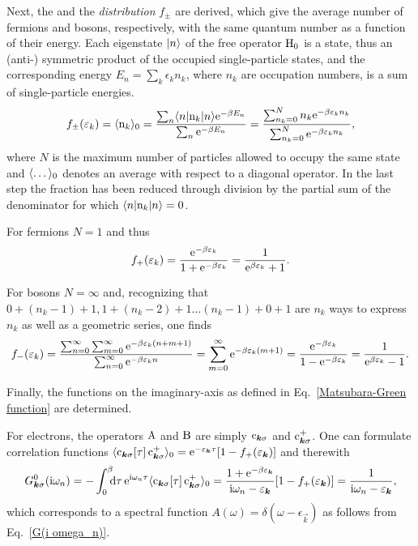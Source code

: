 Next, the \emph{} and the \emph{
distribution} $f_\pm$ are derived, which give the average number of fermions and
bosons, respectively, with the same quantum number as a function of their
energy. Each eigenstate $|n\rangle$ of the free  operator $\mathrm H_0$
is a  state, thus an (anti-) symmetric product of the occupied
single-particle states, and the corresponding energy $E_n = \sum_k \epsilon_k
n_k$, where $n_k$ are occupation numbers, is a sum of single-particle energies.
%
\begin{equation*}
    f_\pm(\varepsilon_k) = \langle\mathrm n_k\rangle_0
    = \frac{\sum_n \langle n| \mathrm n_k |n\rangle \mathrm e^{-\beta E_n}}
        {\sum_n \mathrm e^{-\beta E_n}}
    = \frac{\sum_{n_k = 0}^N n_k \mathrm e^{-\beta \varepsilon_k n_k}}
        {\sum_{n_k = 0}^N \mathrm e^{-\beta \varepsilon_k n_k}},
\end{equation*}
%
where $N$ is the maximum number of particles allowed to occupy the same state
and $\langle\dots\rangle_0$ denotes an average with respect to a diagonal 
operator. In the last step the fraction has been reduced through division by the
partial sum of the denominator for which $\langle n| \mathrm n_k |n\rangle = 0$.

For fermions $N = 1$ and thus
%
\begin{equation*}
    f_+(\varepsilon_k) = \frac{\mathrm e^{-\beta \varepsilon_k}}{1 + \mathrm e^{-\beta \varepsilon_k}}
    = \frac 1 {\mathrm e^{\beta \varepsilon_k} + 1}.
\end{equation*}

For bosons $N = \infty$ and, recognizing that $0 + (n_k - 1) + 1, 1 + (n_k - 2)
+ 1 \dots (n_k - 1) + 0 + 1$ are $n_k$ ways to express $n_k$ as well as a
geometric series, one finds
%
\begin{equation*}
    f_-(\varepsilon_k)
    = \frac {\sum_{n = 0}^\infty \sum_{m = 0}^\infty
        \mathrm e^{-\beta \varepsilon_k (n + m + 1)}}
        {\sum_{n = 0}^\infty \mathrm e^{-\beta \varepsilon_k n}}
    = \sum_{m = 0}^\infty \mathrm e^{-\beta \varepsilon_k (m + 1)}
    = \frac{\mathrm e^{-\beta \varepsilon_k}}{1 - \mathrm e^{-\beta \varepsilon_k}}
    = \frac 1 {\mathrm e^{\beta \varepsilon_k} - 1}.
\end{equation*}

Finally, the  functions on the imaginary-axis as defined in
Eq.~\ref{Matsubara-Green function} are determined.

For electrons, the operators $\mathrm A$ and $\mathrm B$ are simply $\mathrm c_{\boldsymbol k
\sigma}$ and $\mathrm c_{\boldsymbol k \sigma}^+$. One can formulate correlation functions
$\langle\mathrm c_{\boldsymbol k \sigma}[\tau] \, \mathrm c_{\boldsymbol k \sigma}^+\rangle_0 =
\mathrm e^{-\varepsilon_{\boldsymbol k} \tau} [1 - f_+(\varepsilon_{\boldsymbol k})]$ and therewith
%
\begin{equation} \label{G_0(i omega_n)}
    G_{\vec k \sigma}^0(\I \omega_n)
    = -\int \from 0 \till \beta \D \tau \, \E^{\I \omega_n \tau}
    \av{\op c_{\vec k \sigma}[\tau] \, \op c_{\vec k \sigma}^+}_0
    = \frac
        {1 + \E^{-\beta \epsilon_{\vec k}}}
        {\I \omega_n - \epsilon_{\vec k}}
        [1 - f_+(\epsilon_{\vec k})]
    = \frac 1 {\I \omega_n - \epsilon_{\vec k}},
\end{equation}
%
which corresponds to a spectral function $A(\omega) = \delta(\omega -
\epsilon_{\vec k})$ as follows from Eq.~\ref{G(i omega_n)}.

